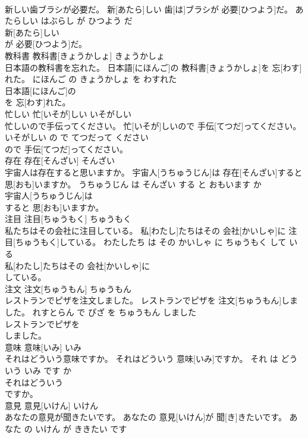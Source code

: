 \documentclass[8pt]{extreport}
\begin{document}
\begin{CJK}{UTF8}{min}
\\	新しい歯ブラシが必要だ。	新[あたら]しい 歯[は]ブラシが 必要[ひつよう]だ。	あたらしい はぶらし が ひつよう だ	
\\	新[あたら]しい
\\	が 必要[ひつよう]だ。			
\\	教科書	教科書[きょうかしょ]	きょうかしょ	
\\	日本語の教科書を忘れた。	日本語[にほんご]の 教科書[きょうかしょ]を 忘[わす]れた。	にほんご の きょうかしょ を わすれた	
\\	日本語[にほんご]の
\\	を 忘[わす]れた。			
\\	忙しい	忙[いそが]しい	いそがしい	
\\	忙しいので手伝ってください。	忙[いそが]しいので 手伝[てつだ]ってください。	いそがしい の で てつだって ください	
\\	ので 手伝[てつだ]ってください。			
\\	存在	存在[そんざい]	そんざい	
\\	宇宙人は存在すると思いますか。	宇宙人[うちゅうじん]は 存在[そんざい]すると 思[おも]いますか。	うちゅうじん は そんざい する と おもいます か	
\\	宇宙人[うちゅうじん]は
\\	すると 思[おも]いますか。			
\\	注目	注目[ちゅうもく]	ちゅうもく	
\\	私たちはその会社に注目している。	私[わたし]たちはその 会社[かいしゃ]に 注目[ちゅうもく]している。	わたしたち は その かいしゃ に ちゅうもく して いる	
\\	私[わたし]たちはその 会社[かいしゃ]に
\\	している。			
\\	注文	注文[ちゅうもん]	ちゅうもん	
\\	レストランでピザを注文しました。	レストランでピザを 注文[ちゅうもん]しました。	れすとらん で ぴざ を ちゅうもん しました	
\\	レストランでピザを
\\	しました。			
\\	意味	意味[いみ]	いみ	
\\	それはどういう意味ですか。	それはどういう 意味[いみ]ですか。	それ は どういう いみ です か	
\\	それはどういう
\\	ですか。			
\\	意見	意見[いけん]	いけん	
\\	あなたの意見が聞きたいです。	あなたの 意見[いけん]が 聞[き]きたいです。	あなた の いけん が ききたい です	

\end{CJK}
\end{document}

